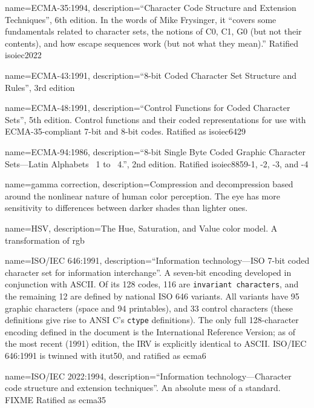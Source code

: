 {
  name={ECMA-35:1994},
  description={``Character Code Structure and Extension Techniques'', 6th
    edition. In the words of Mike Frysinger, it ``covers some fundamentals
    related to character sets, the notions of C0, C1, G0 (but not their
    contents), and how escape sequences work (but not what they mean)\cite{hterm}.''
    Ratified \Gls{isoiec2022}}
}

{
  name={ECMA-43:1991},
  description={``8-bit Coded Character Set Structure and Rules'', 3rd edition}
}

{
  name={ECMA-48:1991},
  description={``Control Functions for Coded Character Sets'', 5th edition.
    Control functions and their coded representations for use with ECMA-35-compliant
    7-bit and 8-bit codes.
   Ratified as \Gls{isoiec6429}}
}

{
  name={ECMA-94:1986},
  description={``8-bit Single Byte Coded Graphic Character Sets---Latin
    Alphabets \textnumero\ 1 to \textnumero\ 4.'', 2nd edition. Ratified
    \Gls{isoiec8859}-1, -2, -3, and -4}
}

{
  name={gamma correction},
  description={Compression and decompression based around the nonlinear nature
   of human color perception. The eye has more sensitivity to differences between
   darker shades than lighter ones.}
}

{
  name={HSV},
  description={The Hue, Saturation, and Value color model. A transformation of \Gls{rgb}}
}

{
  name={ISO/IEC 646:1991},
  description={``Information technology---ISO 7-bit coded character set for
    information interchange''. A seven-bit encoding developed in conjunction
    with ASCII. Of its 128 codes, 116 are \texttt{invariant characters}, and
    the remaining 12 are defined by national ISO 646 variants. All variants
    have 95 graphic characters (space and 94 printables), and 33 control
    characters (these definitions give rise to ANSI C's \texttt{ctype}
    definitions). The only full 128-character encoding defined in the document
    is the International Reference Version; as of the most recent (1991)
    edition, the IRV is explicitly identical to ASCII. ISO/IEC 646:1991 is
    twinned with \Gls{itut50}, and ratified as \Gls{ecma6}}
}

{
  name={ISO/IEC 2022:1994},
  description={``Information technology---Character code structure and extension techniques''.
   An absolute mess of a standard. FIXME
   Ratified as \Gls{ecma35}}
}

